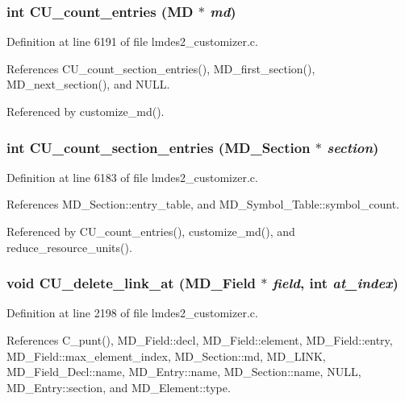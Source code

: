 \subsubsection{\setlength{\rightskip}{0pt plus 5cm}int CU\_\-count\_\-entries (\bf{MD} $\ast$ {\em md})}\label{lmdes2__customizer_8c_d85163db809465f91b4a016d3862ad69}




Definition at line 6191 of file lmdes2\_\-customizer.c.

References CU\_\-count\_\-section\_\-entries(), MD\_\-first\_\-section(), MD\_\-next\_\-section(), and NULL.

Referenced by customize\_\-md().
\subsubsection{\setlength{\rightskip}{0pt plus 5cm}int CU\_\-count\_\-section\_\-entries (\bf{MD\_\-Section} $\ast$ {\em section})}\label{lmdes2__customizer_8c_5bc12c0dabc53b4b665ed97e99dde230}




Definition at line 6183 of file lmdes2\_\-customizer.c.

References MD\_\-Section::entry\_\-table, and MD\_\-Symbol\_\-Table::symbol\_\-count.

Referenced by CU\_\-count\_\-entries(), customize\_\-md(), and reduce\_\-resource\_\-units().
\subsubsection{\setlength{\rightskip}{0pt plus 5cm}void CU\_\-delete\_\-link\_\-at (\bf{MD\_\-Field} $\ast$ {\em field}, int {\em at\_\-index})}\label{lmdes2__customizer_8c_92c91ed1ca364644c08508886798782e}




Definition at line 2198 of file lmdes2\_\-customizer.c.

References C\_\-punt(), MD\_\-Field::decl, MD\_\-Field::element, MD\_\-Field::entry, MD\_\-Field::max\_\-element\_\-index, MD\_\-Section::md, MD\_\-LINK, MD\_\-Field\_\-Decl::name, MD\_\-Entry::name, MD\_\-Section::name, NULL, MD\_\-Entry::section, and MD\_\-Element::type.

